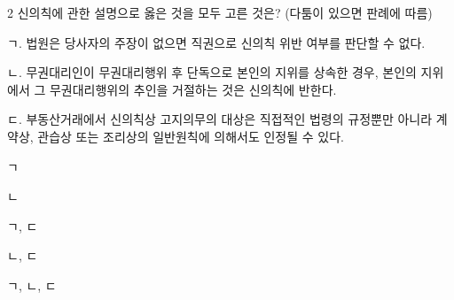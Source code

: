 \begin{question}{2}
신의칙에 관한 설명으로 옳은 것을 모두 고른 것은? (다툼이 있으면 판례에 따름)
\begin{framedtext}
ㄱ. 법원은 당사자의 주장이 없으면 직권으로 신의칙 위반 여부를 판단할 수 없다. \par
ㄴ. 무권대리인이 무권대리행위 후 단독으로 본인의 지위를 상속한 경우, 본인의 지위에서 그 무권대리행위의 추인을 거절하는 것은 신의칙에 반한다. \par
ㄷ. 부동산거래에서 신의칙상 고지의무의 대상은 직접적인 법령의 규정뿐만 아니라 계약상, 관습상 또는 조리상의 일반원칙에 의해서도 인정될 수 있다.
\end{framedtext}
\begin{choices}
  \item ㄱ
  \item ㄴ
  \item ㄱ, ㄷ
  \item ㄴ, ㄷ
  \item ㄱ, ㄴ, ㄷ
\end{choices}
\end{question}
